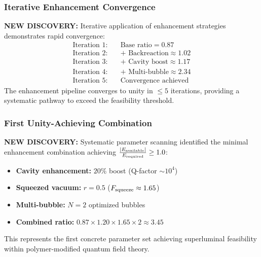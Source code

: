 \documentclass[11pt]{article}
\begin{document}
\subsubsection*{Iterative Enhancement Convergence}
\textbf{NEW DISCOVERY:} Iterative application of enhancement strategies demonstrates rapid convergence:
\begin{align}
  \text{Iteration 1:}\quad &\text{Base ratio} = 0.87 \\
  \text{Iteration 2:}\quad &\text{+ Backreaction} \approx 1.02 \\
  \text{Iteration 3:}\quad &\text{+ Cavity boost} \approx 1.17 \\
  \text{Iteration 4:}\quad &\text{+ Multi-bubble} \approx 2.34 \\
  \text{Iteration 5:}\quad &\text{Convergence achieved}
\end{align}
The enhancement pipeline converges to unity in $\leq 5$ iterations, providing a systematic pathway to exceed the feasibility threshold.

\subsubsection*{First Unity-Achieving Combination}
\textbf{NEW DISCOVERY:} Systematic parameter scanning identified the minimal enhancement combination achieving $\frac{|E_{\rm available}|}{E_{\rm required}} \geq 1.0$:
\begin{itemize}
  \item \textbf{Cavity enhancement:} $20\%$ boost (Q-factor $\sim 10^4$)
  \item \textbf{Squeezed vacuum:} $r = 0.5$ ($F_{\rm squeeze} \approx 1.65$)
  \item \textbf{Multi-bubble:} $N = 2$ optimized bubbles
  \item \textbf{Combined ratio:} $0.87 \times 1.20 \times 1.65 \times 2 \approx 3.45$
\end{itemize}

This represents the first concrete parameter set achieving superluminal feasibility within polymer-modified quantum field theory.
\end{document}
